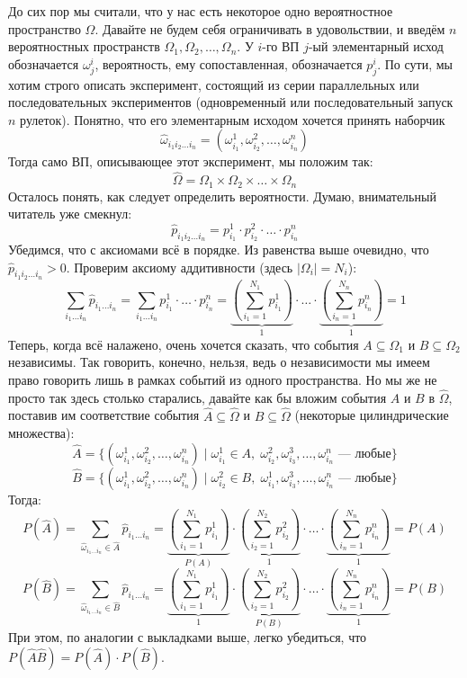 \documentclass[11pt]{article}
\begin{document}
До сих пор мы считали, что у нас есть некоторое одно вероятностное пространство $\Omega$. Давайте не будем себя ограничивать в удовольствии, и введём $n$ вероятностных пространств $\Omega_1, \Omega_2, \ldots, \Omega_n$. У $i$-го ВП $j$-ый элементарный исход обозначается $\omega_j^i$, вероятность, ему сопоставленная, обозначается $p_j^i$. По сути, мы хотим строго описать эксперимент, состоящий из серии параллельных или последовательных экспериментов (одновременный или последовательный запуск $n$ рулеток). Понятно, что его элементарным исходом хочется принять наборчик
\[\widehat{\omega}_{i_1 i_2 \ldots i_n} = (\omega_{i_1}^1, \omega_{i_2}^2, \ldots, \omega_{i_n}^n)\]
Тогда само ВП, описывающее этот эксперимент, мы положим так:
\[\widehat{\Omega} = \Omega_1 \times \Omega_2 \times \ldots \times \Omega_n\]
Осталось понять, как следует определить вероятности. Думаю, внимательный читатель уже смекнул:
\[\widehat{p}_{i_1 i_2 \ldots i_n} = p_{i_1}^1 \cdot p_{i_2}^2 \cdot \ldots \cdot p_{i_n}^n\]
Убедимся, что с аксиомами всё в порядке. Из равенства выше очевидно, что $\widehat{p}_{i_1 i_2 \ldots i_n} > 0$. Проверим аксиому аддитивности (здесь $\left\lvert \Omega_i \right\rvert = N_i$):
\[\sum_{i_1 \ldots i_n} \widehat{p}_{i_1 \ldots i_n} = \sum_{i_1 \ldots i_n} p_{i_1}^1 \cdot \ldots \cdot p_{i_n}^n = \underbrace{\left(\sum_{i_1 = 1}^{N_1} p_{i_1}^1\right)}_{1} \cdot \ldots \cdot \underbrace{\left(\sum_{i_n = 1}^{N_n} p_{i_n}^n\right)}_{1} = 1\]
Теперь, когда всё налажено, очень хочется сказать, что события $A \subseteq \Omega_1$ и $B \subseteq \Omega_2$ независимы. Так говорить, конечно, нельзя, ведь о независимости мы имеем право говорить лишь в рамках событий из одного пространства. Но мы же не просто так здесь столько старались, давайте как бы вложим события $A$ и $B$ в $\widehat{\Omega}$, поставив им соответствие события $\widehat{A} \subseteq \widehat{\Omega}$ и $\widehat{B} \subseteq \widehat{\Omega}$ (некоторые цилиндрические множества):
\[\widehat{A} = \{(\omega_{i_1}^1, \omega_{i_2}^2, \ldots, \omega_{i_n}^n) \; | \; \omega_{i_1}^1 \in A, \; \omega_{i_2}^2, \omega_{i_3}^3, \ldots, \omega_{i_n}^n \text{ --- любые}\}\]
\[\widehat{B} = \{(\omega_{i_1}^1, \omega_{i_2}^2, \ldots, \omega_{i_n}^n) \; | \; \omega_{i_2}^2 \in B, \; \omega_{i_1}^1, \omega_{i_3}^3, \ldots, \omega_{i_n}^n \text{ --- любые}\}\]
Тогда:
\[P(\widehat{A}) = \sum_{\widehat{\omega}_{i_1 \ldots i_n} \in \widehat{A}} \widehat{p}_{i_1 \ldots i_n} = \underbrace{\left(\sum_{i_1 = 1}^{N_1} p_{i_1}^1\right)}_{P(A)} \cdot \underbrace{\left(\sum_{i_2 = 1}^{N_2} p_{i_2}^2\right)}_{1} \cdot \ldots \cdot \underbrace{\left(\sum_{i_n = 1}^{N_n} p_{i_n}^n\right)}_{1} = P(A)\]
\[P(\widehat{B}) = \sum_{\widehat{\omega}_{i_1 \ldots i_n} \in \widehat{B}} \widehat{p}_{i_1 \ldots i_n} = \underbrace{\left(\sum_{i_1 = 1}^{N_1} p_{i_1}^1\right)}_{1} \cdot \underbrace{\left(\sum_{i_2 = 1}^{N_2} p_{i_2}^2\right)}_{P(B)} \cdot \ldots \cdot \underbrace{\left(\sum_{i_n = 1}^{N_n} p_{i_n}^n\right)}_{1} = P(B)\]
При этом, по аналогии с выкладками выше, легко убедиться, что $P(\widehat{A} \widehat{B}) = P(\widehat{A}) \cdot P(\widehat{B})$.
\end{document}
